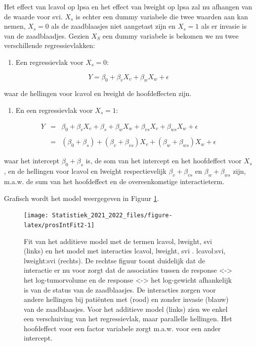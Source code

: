 \documentclass[
  12pt,dutch,coursenotes]{book}
\providecommand{\tightlist}{%
  \setlength{\itemsep}{0pt}\setlength{\parskip}{0pt}}
\theoremstyle{definition}
\theoremstyle{definition}
\theoremstyle{definition}
\theoremstyle{definition}
\theoremstyle{remark}
\begin{document}
Het effect van lcavol op lpsa en het effect van lweight op lpsa zal nu afhangen van de waarde voor svi.
\(X_s\) is echter een dummy variabele die twee waarden aan kan nemen, \(X_s=0\) als de zaadblaasjes niet aangetast zijn en \(X_s=1\) als er invasie is van de zaadblaadjes.
Gezien \(X_S\) een dummy variabele is bekomen we nu twee verschillende regressievlakken:

\begin{enumerate}
\def\labelenumi{\arabic{enumi}.}
\tightlist
\item
  Een regressievlak voor \(X_s=0\):
\end{enumerate}

\[Y=\beta_0+\beta_vX_v+\beta_wX_w + \epsilon\]

waar de hellingen voor lcavol en lweight de hoofdeffecten zijn.

\begin{enumerate}
\def\labelenumi{\arabic{enumi}.}
\setcounter{enumi}{1}
\tightlist
\item
  En een regressievlak voor \(X_s=1\):
\end{enumerate}

\[
  \begin{array}{lcl}
  Y&=&\beta_0+\beta_vX_v+\beta_s+\beta_wX_w+\beta_{vs}X_v + \beta_{ws}X_w +\epsilon\\\\
  &=&(\beta_0+\beta_s)+(\beta_v+\beta_{vs})X_v+(\beta_w+\beta_{ws})X_w+\epsilon
  \end{array}
  \]

waar het intercept \(\beta_0 + \beta_s\) is, de som van het intercept en het hoofdeffect voor \(X_s\), en de hellingen voor lcavol en lweight respectievelijk \(\beta_v+\beta_{vs}\) en \(\beta_w+\beta_{ws}\) zijn, m.a.w. de sum van het hoofdeffect en de overeenkomstige interactieterm.

Grafisch wordt het model weergegeven in Figuur \ref{fig:prosIntFit2}.

\begin{figure}

{\centering \texttt{[image: Statistiek\_2021\_2022\_files/figure-latex/prosIntFit2-1]} 

}

\caption{Fit van het additieve model met de termen lcavol, lweight, svi (links) en het model met interacties lcavol, lweight, svi . lcavol:svi, lweight:svi (rechts). De rechtse figuur toont duidelijk dat de interactie er nu voor zorgt dat de associaties tussen de response <-> het log-tumorvolume en de response <-> het log-gewicht afhankelijk is van de status van de zaadblaasjes. De interacties zorgen voor andere hellingen bij patiënten met (rood) en zonder invasie (blauw) van de zaadblaasjes. Voor het additieve model (links) zien we enkel een verschuiving van het regressievlak, maar parallelle hellingen. Het hoofdeffect voor een factor variabele zorgt m.a.w. voor een ander intercept.}\label{fig:prosIntFit2}
\end{figure}
\end{document}
